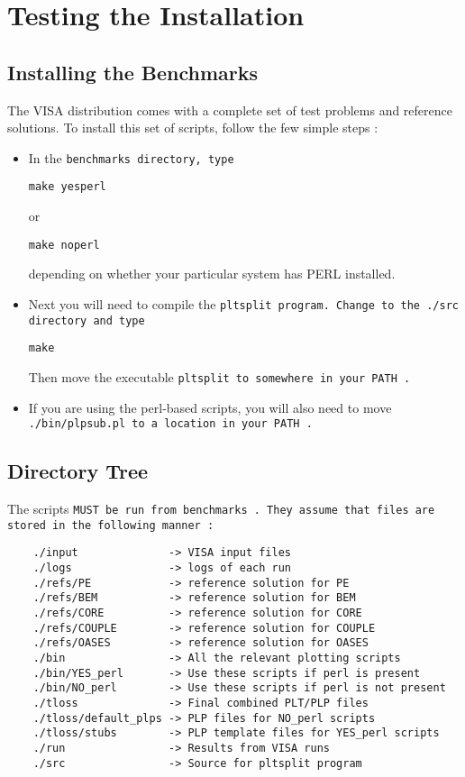 \section{Testing the Installation}
\subsection{Installing the Benchmarks}
The VISA distribution comes with a complete set of test problems
and reference solutions. 
To install this set of scripts, follow the few simple steps :
\begin{itemize}
\item In the \tt benchmarks \rm directory, type

\tt make yesperl \rm

or

\tt make noperl \rm

\noindent depending on whether your particular system has PERL installed.

\item Next you will need to compile the \tt pltsplit \rm program. Change to the
\tt ./src \rm directory and type

\tt make \rm

\noindent Then move the executable \tt pltsplit \rm to somewhere in your 
\tt PATH \rm.

\item If you are using the perl-based scripts, you will also need to 
    move \tt ./bin/plpsub.pl \rm to a location in your \tt PATH \rm.

\end{itemize}

\subsection{Directory Tree}
The scripts \tt MUST \rm be run from \tt benchmarks \rm. They assume that 
files are stored in the following manner :
\begin{verbatim}
    ./input              -> VISA input files
    ./logs               -> logs of each run
    ./refs/PE            -> reference solution for PE
    ./refs/BEM           -> reference solution for BEM
    ./refs/CORE          -> reference solution for CORE
    ./refs/COUPLE        -> reference solution for COUPLE
    ./refs/OASES         -> reference solution for OASES
    ./bin                -> All the relevant plotting scripts
    ./bin/YES_perl       -> Use these scripts if perl is present
    ./bin/NO_perl        -> Use these scripts if perl is not present
    ./tloss              -> Final combined PLT/PLP files
    ./tloss/default_plps -> PLP files for NO_perl scripts
    ./tloss/stubs        -> PLP template files for YES_perl scripts
    ./run                -> Results from VISA runs
    ./src                -> Source for pltsplit program
\end{verbatim}

